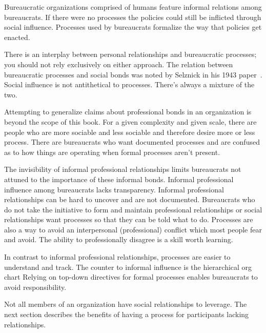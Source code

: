 Bureaucratic organizations comprised of humans feature informal relations among bureaucrats. If there were no processes the policies could still be inflicted through social influence. Processes used by bureaucrats formalize the way that policies get enacted. 

There is an interplay between personal relationships and bureaucratic processes; you should not rely exclusively on either approach. The relation between bureaucratic processes and social bonds was noted by Selznick in his 1943 paper~\cite{1943_Selznick}. 
Social influence is not antithetical to processes. There's always a mixture of the two.

Attempting to generalize claims about professional bonds in an organization is beyond the scope of this book. 
For a given complexity and given scale, there are people who are more sociable and less sociable and therefore desire more or less process.
There are bureaucrats who want documented processes and are confused as to how things are operating when formal processes aren't present. 

The invisibility of informal professional relationships limits bureaucrats not attuned to the importance of these informal bonds. 
Informal professional influence among bureaucrats lacks transparency. Informal professional relationships can be hard to uncover and are not documented. 
Bureaucrats who do not take the initiative to form and maintain professional relationships or social relationships want processes so that they can be told what to do. Processes are also a way to avoid an interpersonal (professional) conflict which most people fear and avoid. The ability to professionally disagree is a skill worth learning.

In contrast to informal professional relationships, processes are easier to understand and track. The counter to informal influence is the hierarchical 
\gls{org chart}%
\iftoggle{haspagenumbers}{ described on page~\pageref{sec:org-chart-as-guide-and-lie}.}{.}
Relying on top-down directives for formal processes enables bureaucrats to avoid responsibility.

Not all members of an organization have social relationships to leverage. The next section describes the benefits of having a process for participants lacking relationships.

